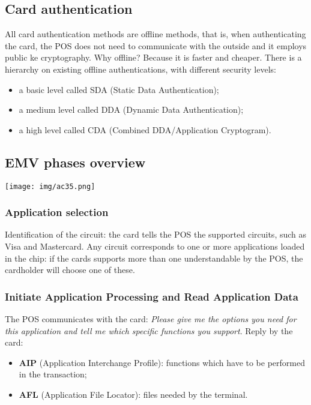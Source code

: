 \documentclass[a4paper, 10pt, titlepage]{article}
\begin{document}
\subsection{Card authentication}
All card authentication methods are offline methods, that is, when authenticating the card, the POS does not need to communicate with the outside and it employs public ke cryptography. Why offline? Because it is faster and cheaper. There is a hierarchy on existing offline authentications, with different security levels:
\begin{itemize}
\item a basic level called SDA (Static Data Authentication);
\item a medium level called DDA (Dynamic Data Authentication);
\item a high level called CDA (Combined DDA/Application Cryptogram).
\end{itemize}

\subsection{EMV phases overview}
\begin{center}
\texttt{[image: img/ac35.png]}
\end{center}

\subsubsection{Application selection}
Identification of the circuit: the card tells the POS the supported circuits, such as Visa and Mastercard. Any circuit corresponds to one or more applications loaded in the chip: if the cards supports more than one understandable by the POS, the cardholder will choose one of these.

\subsubsection{Initiate Application Processing and Read Application Data}
The POS communicates with the card: \textit{Please give me the options you need for this application and tell me which specific functions you support}. Reply by the card:
\begin{itemize}
\item \textbf{AIP} (Application Interchange Profile): functions which have to be performed in the transaction;
\item \textbf{AFL} (Application File Locator): files needed by the terminal.
\end{itemize}
\end{document}
